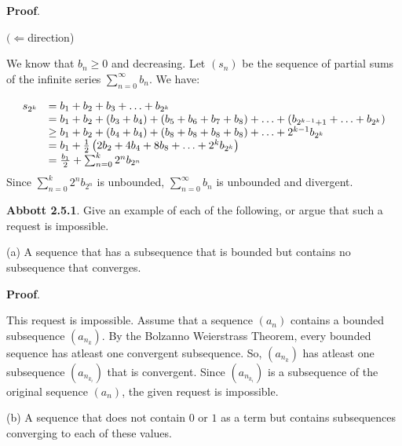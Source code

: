 \documentclass[10pt]{article}
\begin{document}
\textbf{Proof}.



$\displaystyle ( \Longleftarrow $direction)



We know that $\displaystyle b_{n} \geq 0$ and decreasing. Let $\displaystyle ( s_{n})$ be the sequence of partial sums of the infinite series $\displaystyle \sum _{n=0}^{\infty } b_{n}$. We have:


\begin{equation*}
\begin{array}{ c l }
s_{2^{k}} & =b_{1} +b_{2} +b_{3} +\dotsc +b_{2^{k}}\\
 & =b_{1} +b_{2} +( b_{3} +b_{4}) +( b_{5} +b_{6} +b_{7} +b_{8}) +\dotsc +( b_{2^{k-1} +1} +\dotsc +b_{2^{k}})\\
 & \geq b_{1} +b_{2} +( b_{4} +b_{4}) +( b_{8} +b_{8} +b_{8} +b_{8}) +\dotsc +2^{k-1} b_{2^{k}}\\
 & =b_{1} +\frac{1}{2}\left( 2b_{2} +4b_{4} +8b_{8} +\dotsc +2^{k} b_{2^{k}}\right)\\
 & =\frac{b_{1}}{2} +\sum _{n=0}^{k} 2^{n} b_{2^{n}}
\end{array}
\end{equation*}
Since $\displaystyle \sum _{n=0}^{k} 2^{n} b_{2^{n}}$ is unbounded, $\displaystyle \sum _{n=0}^{\infty } b_{n}$ is unbounded and divergent.



\textbf{Abbott 2.5.1}.\textbf{ }Give an example of each of the following, or argue that such a request is impossible.



(a) A sequence that has a subsequence that is bounded but contains no subsequence that converges.



\textbf{Proof}.

This request is impossible. Assume that a sequence $\displaystyle ( a_{n})$ contains a bounded subsequence $\displaystyle ( a_{n_{k}})$. By the Bolzanno Weierstrass Theorem, every bounded sequence has atleast one convergent subsequence. So, $\displaystyle ( a_{n_{k}})$ has atleast one subsequence $\displaystyle ( a_{n_{k_{i}}})$ that is convergent. Since $\displaystyle ( a_{n_{k_{i}}})$ is a subsequence of the original sequence $\displaystyle ( a_{n})$, the given request is impossible.



(b) A sequence that does not contain $\displaystyle 0$ or $\displaystyle 1$ as a term but contains subsequences converging to each of these values. 
\end{document}
